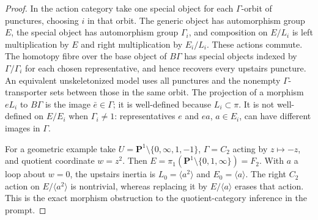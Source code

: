 \begin{proof}
In the action category take one special object for each $\Gamma$-orbit
of punctures, choosing $i$ in that orbit. The generic object has
automorphism group $E$, the special object has automorphism group
$\Gamma_i$, and composition
on $E/L_i$ is left multiplication by $E$ and right multiplication by
$E_i/L_i$. These actions commute. The homotopy fibre over the base object of
$B\Gamma$ has special objects indexed by $\Gamma/\Gamma_i$ for each
chosen representative, and hence recovers every upstairs puncture. An
equivalent unskeletonized model uses all punctures and the nonempty
$\Gamma$-transporter sets between those in the same orbit. The
projection of a morphism $eL_i$
to $B\Gamma$ is the image $\bar e\in\Gamma$; it is well-defined because
$L_i\subset\pi$. It is not well-defined on $E/E_i$ when
$\Gamma_i\ne1$: representatives $e$ and $ea$, $a\in E_i$, can have
different images in $\Gamma$.

For a geometric example take $U=\mathbf P^1\setminus\{0,\infty,1,-1\}$,
$\Gamma=C_2$ acting by $z\mapsto-z$, and quotient coordinate $w=z^2$.
Then $E=\pi_1(\mathbf P^1\setminus\{0,1,\infty\})=F_2$. With $a$ a
loop about $w=0$, the upstairs inertia is $L_0=\langle a^2\rangle$
and $E_0=\langle a\rangle$. The right $C_2$ action on
$E/\langle a^2\rangle$ is nontrivial, whereas replacing it by
$E/\langle a\rangle$ erases that action. This is the exact morphism
obstruction to the quotient-category inference in the prompt.
\end{proof}

